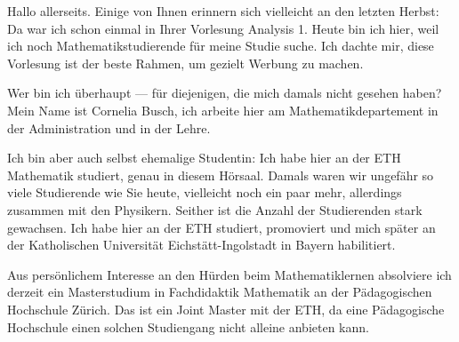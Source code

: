 \begin{spoken-clean}[00:41:29 - 00:43:54]
Hallo allerseits. Einige von Ihnen erinnern sich vielleicht an den letzten Herbst: Da war ich schon einmal in Ihrer Vorlesung Analysis 1. Heute bin ich hier, weil ich noch Mathematikstudierende für meine Studie suche. Ich dachte mir, diese Vorlesung ist der beste Rahmen, um gezielt Werbung zu machen. 

Wer bin ich überhaupt --- für diejenigen, die mich damals nicht gesehen haben? Mein Name ist Cornelia Busch, ich arbeite hier am Mathematikdepartement in der Administration und in der Lehre. 

Ich bin aber auch selbst ehemalige Studentin: Ich habe hier an der ETH Mathematik studiert, genau in diesem Hörsaal. Damals waren wir ungefähr so viele Studierende wie Sie heute, vielleicht noch ein paar mehr, allerdings zusammen mit den Physikern. Seither ist die Anzahl der Studierenden stark gewachsen. Ich habe hier an der ETH studiert, promoviert und mich später an der Katholischen Universität Eichstätt-Ingolstadt in Bayern habilitiert. 

Aus persönlichem Interesse an den Hürden beim Mathematiklernen absolviere ich derzeit ein Masterstudium in Fachdidaktik Mathematik an der Pädagogischen Hochschule Zürich. Das ist ein Joint Master mit der ETH, da eine Pädagogische Hochschule einen solchen Studiengang nicht alleine anbieten kann.
\end{spoken-clean}


